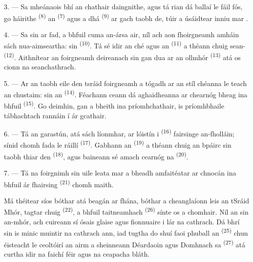 3. --- Sa mheánaois bhí an chathair daingnithe, agus tá rian dá ballaí le fáil fós,
go háirithe  \textsuperscript{(8)} an  \textsuperscript{(7)} agus a dhá  \textsuperscript{(9)} ar
gach taobh de, túir a úsáidtear inniu mar .

4. --- Sa  sin ar fad, a bhfuil cuma an-ársa air, níl ach aon
fhoirgneamh amháin sách nua-aimseartha: sin 
\textsuperscript{(10)}. Tá sé idir an ché agus an 
\textsuperscript{(11)} a théann chuig sean-
\textsuperscript{(12)}. Aithnítear an foirgneamh deireanach sin gan dua ar an
 ollmhór \textsuperscript{(13)} atá os cionn na seanchathrach.

5. --- Ar an taobh eile den tsráid  foirgneamh a tógadh ar an stíl
chéanna le teach an chustaim: sin an  \textsuperscript{(14)}.
Féachann ceann dá aghaidheanna ar chearnóg bheag ina bhfuil  \textsuperscript{(15)}. Go deimhin, gan a bheith ina príomhchathair, is
príomhbhaile tábhachtach rannáin í ár gcathair.

\VUsaut{5.0mm}
\VUsaut{3.4mm}

6. --- Tá an garastún, atá sách líonmhar, ar lóistín i 
\textsuperscript{(16)} fairsinge an-fholláin; sínid chomh fada le ráillí  \textsuperscript{(17)}. Gabhann an 
\textsuperscript{(19)} a théann chuig an bpáirc sin taobh thiar den  \textsuperscript{(18)}, agus baineann sé amach cearnóg na 
\textsuperscript{(20)}.

7. --- Tá na foirgnimh sin uile leata mar a bheadh amfaitéatar ar chnocán ina bhfuil
ár  fhairsing \textsuperscript{(21)} chomh maith.

Má théitear síos bóthar atá beagán ar fhána, bóthar a cheanglaíonn leis an tSráid
Mhór, tagtar chuig  \textsuperscript{(22)}, a bhfuil
 taitneamhach \textsuperscript{(26)} sínte os a chomhair. Níl an
 sin an-mhór, ach cuireann sí ósais glaise agus fionnuaire i lár na
cathrach. Dá bhrí sin is minic muintir na cathrach ann, iad tugtha do shuí faoi
phuball an  \textsuperscript{(25)} chun éisteacht le ceoltóirí an airm a
sheinneann Déardaoin agus Domhnach sa  \textsuperscript{(27)}
atá curtha idir na faichí féir agus na ceapacha bláth.


